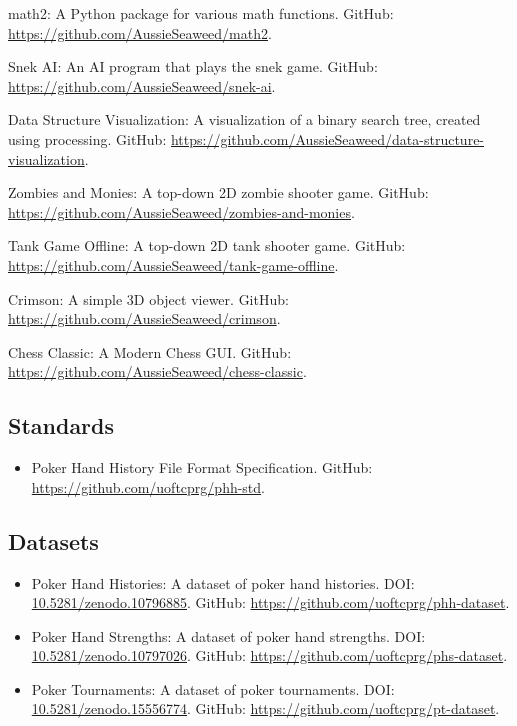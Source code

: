 \documentclass{article}
\begin{document}
\begin{itemize}
{			\item math2: A Python package for various math functions. {\small GitHub: \url{https://github.com/AussieSeaweed/math2}.}
			\item Snek AI: An AI program that plays the snek game. {\small GitHub: \url{https://github.com/AussieSeaweed/snek-ai}.}
			\item Data Structure Visualization: A visualization of a binary search tree, created using processing. {\small GitHub: \url{https://github.com/AussieSeaweed/data-structure-visualization}.}
			\item Zombies and Monies: A top-down 2D zombie shooter game. {\small GitHub: \url{https://github.com/AussieSeaweed/zombies-and-monies}.}
			\item Tank Game Offline: A top-down 2D tank shooter game. {\small GitHub: \url{https://github.com/AussieSeaweed/tank-game-offline}.}
			\item Crimson: A simple 3D object viewer. {\small GitHub: \url{https://github.com/AussieSeaweed/crimson}.}
			\item Chess Classic: A Modern Chess GUI. {\small GitHub: \url{https://github.com/AussieSeaweed/chess-classic}.}
		}{}
	\end{itemize}

	\subsection*{Standards}

	\begin{itemize}
		\item Poker Hand History File Format Specification. {\small GitHub: \url{https://github.com/uoftcprg/phh-std}.}
	\end{itemize}

	\subsection*{Datasets}

	\begin{itemize}
		\item Poker Hand Histories: A dataset of poker hand histories. {\small DOI: \href{https://doi.org/10.5281/zenodo.10796885}{10.5281/zenodo.10796885}. GitHub: \url{https://github.com/uoftcprg/phh-dataset}.}
		\item Poker Hand Strengths: A dataset of poker hand strengths. {\small DOI: \href{https://doi.org/10.5281/zenodo.10797026}{10.5281/zenodo.10797026}. GitHub: \url{https://github.com/uoftcprg/phs-dataset}.}
		\iftoggle{verbose}{
			\item Poker Statistical Analyses: A dataset of poker statistical analysis calculations. {\small GitHub: \url{https://github.com/uoftcprg/psa-dataset}.}
		}{}
		\item Poker Tournaments: A dataset of poker tournaments. {\small DOI: \href{https://doi.org/10.5281/zenodo.15556774}{10.5281/zenodo.15556774}. GitHub: \url{https://github.com/uoftcprg/pt-dataset}.}
	\end{itemize}
\end{document}
